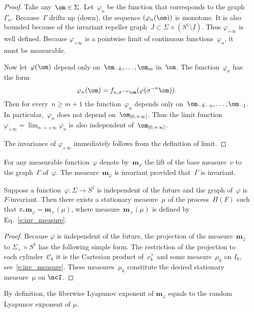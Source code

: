 \documentclass[a4paper,12pt]{amsart}
\begin{document}
\begin{proof}
Take any~$\om \in \Sigma$. Let~$\varphi_n$ be the function that corresponds to the graph~$\Gamma_n$. Because~$\Gamma$ drifts up (down), the sequence $(\varphi_n(\om))$ is monotone. It is also bounded because of the invariant repeller graph~$J \subset \Sigma \times (S^1 \setminus I)$. Thus $\varphi_{+\infty}$ is well defined. Because $\varphi_{+\infty}$ is a pointwise limit of continuous functions~$\varphi_n$, it must be measurable.

Now let~$\varphi(\om)$ depend only on~$\om_{-k}, \ldots, \om_m$ in~$\om$. The function~$\varphi_n$ has the form
$$
\varphi_n(\om) = f_{n, \sigma^{-n}\om} (\varphi (\sigma^{-n} \om)).
$$
Then for every~$n\ge m+1$ the function~$\varphi_n$ depends only on~$\om_{-k-n}, \ldots, \om_{-1}$. In particular,~$\varphi_n$ does not depend on~$\om_{[0,+\infty]}$. Thus the limit function~$\varphi_{+\infty}=\lim_{n\to+\infty} \varphi_n$ is also independent of~$\om_{[0,+\infty]}$.

The invariance of $\varphi_{+\infty}$ immediately follows from the definition of limit.
\end{proof}

For any measurable function~$\varphi$ denote by~$\mathbf{m}_\varphi$ the lift of the base measure~$\nu$ to the graph~$\Gamma$ of~$\varphi$. The measure~$\mathbf{m}_\varphi$ is invariant provided that~$\Gamma$ is invariant.


\begin{Prop}    \label{p:meas_on_limit}
Suppose a function~$\varphi \colon \Sigma \to S^1$ is independent of the future and the graph of~$\varphi$ is $F$-invariant. Then there exists a stationary measure~$\mu$ of the process~$\Pi(F)$ such that
$\pi_* \mathbf{m}_{\varphi} = \mathbf{m}_+ (\mu)$, where measure~$\mathbf{m}_+ (\mu)$ is defined by Eq.~\eqref{e:inv_measure}. 
\end{Prop}

\begin{proof}
Because $\varphi$ is independent of the future, the projection of the measure~$\mathbf{m}_\varphi$ to $\Sigma_+ \times S^1$ has the following simple form. The restriction of the projection to each cylinder~$\mathcal{C}_k$ it is the Cartesian product of~$\nu_k^+$ and some measure~$\mu_k$ on $I_k$, see~\eqref{e:inv_measure}. These measures~$\mu_k$ constitute the desired stationary measure~$\mu$ on $\mcI$.
\end{proof}

\begin{Rem} \label{r:lyap}
By definition, the fiberwise Lyapunov exponent of $\mathbf{m}_\varphi$ equals to the random Lyapunov exponent of $\mu$.
\end{Rem}
\end{document}
